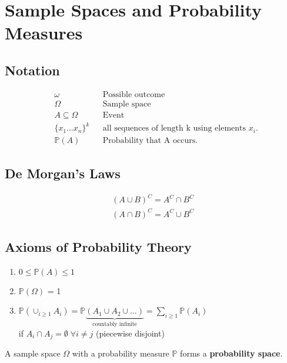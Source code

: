 \section{Sample Spaces and Probability Measures}
\subsection{Notation}
\noindent\begin{align*}
     & \omega                 &  & \text{Possible outcome}                               \\
     & \Omega                 &  & \text{Sample space}                                   \\
     & A \subseteq \Omega     &  & \text{Event}                                          \\
     & {\{x_1 \dots x_n \}}^k &  & \text{all sequences of length k using elements } x_i. \\
     & \mathbb{P}(A)          &  & \text{Probability that A occurs.}
\end{align*}
\subsection{De Morgan's Laws}
\noindent\begin{align*}
    {(A\cup B)}^C = A^C\cap B^C \\
    {(A\cap B)}^C = A^C\cup B^C
\end{align*}

\subsection{Axioms of Probability Theory}
\begin{enumerate}
    \item $0\leq \mathbb{P}(A)\leq 1$
    \item $\mathbb{P}(\Omega)$ = 1
    \item $\mathbb{P}\left(\cup_{i\geq 1} A_i\right) = \mathbb{P}\underbrace{(A_1 \cup A_2 \cup \dots)}_{\text{countably infinite}} = \sum_{i\geq 1} \mathbb{P}(A_i)$\\
          if $A_{i} \cap A_{j} = \emptyset \; \forall i \ne j$ (piecewise disjoint)
\end{enumerate}
A sample space $\Omega$ with a probability measure $\mathbb{P}$ forms a \textbf{probability space}.

